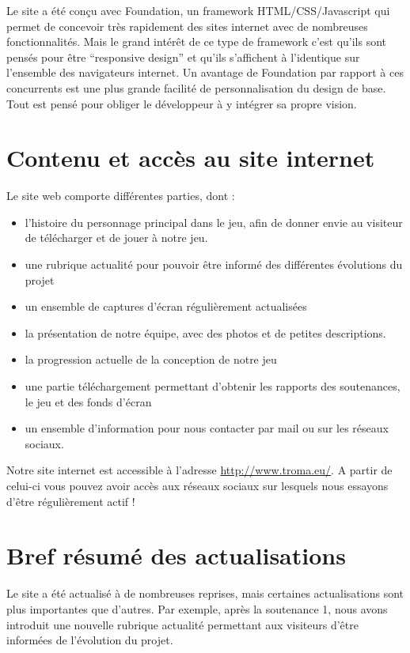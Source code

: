 \documentclass[11pt]{report}
\begin{document}
Le site a été conçu avec Foundation, un framework HTML/CSS/Javascript qui permet de concevoir très rapidement des sites internet avec de nombreuses fonctionnalités. Mais le grand intérêt de ce type de framework c'est qu'ils sont pensés pour être ``responsive design'' et qu'ils s'affichent à l'identique sur l'ensemble des navigateurs internet. Un avantage de Foundation par rapport à ces concurrents est une plus grande facilité de personnalisation du design de base. Tout est pensé pour obliger le développeur à y intégrer sa propre vision.

\section{Contenu et accès au site internet}

Le site web comporte différentes parties, dont :

\begin{itemize}
  \item l’histoire du personnage principal dans le jeu, afin de donner envie au visiteur de télécharger et de jouer à notre jeu.
  \item une rubrique actualité pour pouvoir être informé des différentes évolutions du projet
  \item un ensemble de captures d'écran régulièrement actualisées
  \item la présentation de notre équipe, avec des photos et de petites descriptions.
  \item la progression actuelle de la conception de notre jeu
  \item une partie téléchargement permettant d'obtenir les rapports des soutenances, le jeu et des fonds d'écran
  \item un ensemble d'information pour nous contacter par mail ou sur les réseaux sociaux.
\end{itemize}

Notre site internet est accessible à l'adresse \url{http://www.troma.eu/}. A partir de celui-ci vous pouvez avoir accès aux réseaux sociaux sur lesquels nous essayons d'être régulièrement actif !

\section{Bref résumé des actualisations}

Le site a été actualisé à de nombreuses reprises, mais certaines actualisations sont plus importantes que d'autres. Par exemple, après la soutenance 1, nous avons introduit une nouvelle rubrique actualité permettant aux visiteurs d'être informées de l'évolution du projet.
\end{document}
